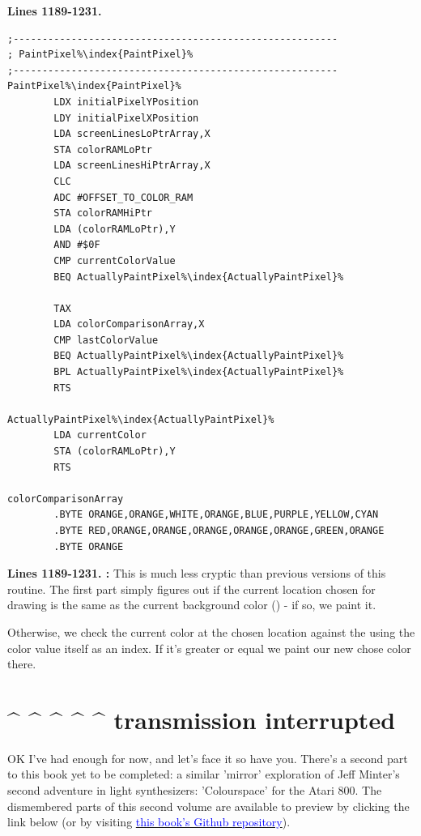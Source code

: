 \textbf{Lines 1189-1231. } 
\begin{lstlisting}[caption = All the pattern data structures in Psychedelia organized into a set of arrays.,escapechar=\%]
;--------------------------------------------------------
; PaintPixel%\index{PaintPixel}%
;--------------------------------------------------------
PaintPixel%\index{PaintPixel}%   
        LDX initialPixelYPosition
        LDY initialPixelXPosition
        LDA screenLinesLoPtrArray,X
        STA colorRAMLoPtr
        LDA screenLinesHiPtrArray,X
        CLC 
        ADC #OFFSET_TO_COLOR_RAM
        STA colorRAMHiPtr
        LDA (colorRAMLoPtr),Y
        AND #$0F
        CMP currentColorValue
        BEQ ActuallyPaintPixel%\index{ActuallyPaintPixel}%

        TAX 
        LDA colorComparisonArray,X
        CMP lastColorValue
        BEQ ActuallyPaintPixel%\index{ActuallyPaintPixel}%
        BPL ActuallyPaintPixel%\index{ActuallyPaintPixel}%
        RTS 

ActuallyPaintPixel%\index{ActuallyPaintPixel}%   
        LDA currentColor
        STA (colorRAMLoPtr),Y
        RTS 

colorComparisonArray   
        .BYTE ORANGE,ORANGE,WHITE,ORANGE,BLUE,PURPLE,YELLOW,CYAN
        .BYTE RED,ORANGE,ORANGE,ORANGE,ORANGE,ORANGE,GREEN,ORANGE
        .BYTE ORANGE

\end{lstlisting}
\clearpage

\textbf{Lines 1189-1231. :} This is much less cryptic than previous versions of this routine. The first part
simply figures out if the current location chosen for drawing is the same as the current background color () - if so,
we paint it.

Otherwise, we check the current color at the chosen location against the  using the color value itself as an index.
If it's greater or equal we paint our new chose color there.

\section*{\string^ \string^ \string^ \string^ \string^ transmission interrupted}
\vspace{-0.3cm}
OK I've had enough for now, and let's face it so have you. There's a second part to this book yet to be completed: a similar 'mirror' exploration
of Jeff Minter's second adventure in light synthesizers: 'Colourspace' for the Atari 800. The dismembered parts of this second volume are available
to preview by clicking the link below (or by visiting \href{https://github.com/mwenge/psypixels}{\textcolor{blue}{ this book's Github repository}}). 

